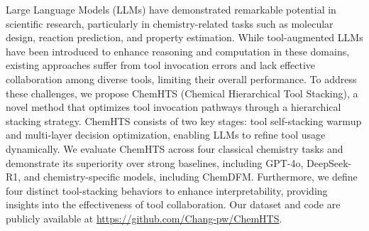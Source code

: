 Large Language Models (LLMs) have demonstrated remarkable potential in scientific research, particularly in chemistry-related tasks such as molecular design, reaction prediction, and property estimation. While tool-augmented LLMs have been introduced to enhance reasoning and computation in these domains, existing approaches suffer from tool invocation errors and lack effective collaboration among diverse tools, limiting their overall performance. To address these challenges, we propose ChemHTS (Chemical Hierarchical Tool Stacking), a novel method that optimizes tool invocation pathways through a hierarchical stacking strategy. ChemHTS consists of two key stages: tool self-stacking warmup and multi-layer decision optimization, enabling LLMs to refine tool usage dynamically. We evaluate ChemHTS across four classical chemistry tasks and demonstrate its superiority over strong baselines, including GPT-4o, DeepSeek-R1, and chemistry-specific models, including ChemDFM. Furthermore, we define four distinct tool-stacking behaviors to enhance interpretability, providing insights into the effectiveness of tool collaboration.
Our dataset and code are publicly available at \url{https://github.com/Chang-pw/ChemHTS}.

